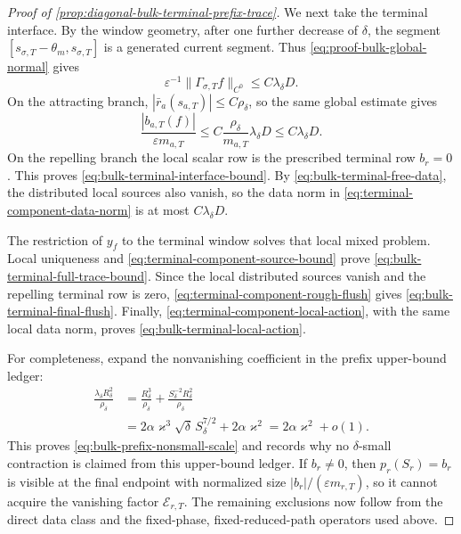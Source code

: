 \begin{proof}[Proof of
\cref{prop:diagonal-bulk-terminal-prefix-trace}]
We next take the terminal interface.  By the window geometry, after one
further decrease of \(\delta\), the segment
\([s_{\sigma,T}-\theta_m,s_{\sigma,T}]\) is a generated current segment.
Thus \cref{eq:proof-bulk-global-normal} gives
\begin{equation}
 \varepsilon^{-1}\|\Gamma_{\sigma,T}f\|_{C^0}
 \le C\lambda_\delta D.                         \label{eq:proof-bulk-interface-history}
\end{equation}
On the attracting branch,
\(|\bar r_a(s_{a,T})|\le C\rho_\delta\), so the same global estimate gives
\begin{equation}
 \frac{|b_{a,T}(f)|}{\varepsilon m_{a,T}}
 \le C\frac{\rho_\delta}{m_{a,T}}
          \lambda_\delta D
 \le C\lambda_\delta D.                        \label{eq:proof-bulk-attracting-interface-row}
\end{equation}
On the repelling branch the local scalar row is the prescribed terminal
row \(b_r=0\).  This proves
\cref{eq:bulk-terminal-interface-bound}.  By
\cref{eq:bulk-terminal-free-data}, the distributed local sources also
vanish, so the data norm in
\cref{eq:terminal-component-data-norm} is at most
\(C\lambda_\delta D\).

The restriction of \(y_f\) to the terminal window solves that local mixed
problem.  Local uniqueness and
\cref{eq:terminal-component-source-bound} prove
\cref{eq:bulk-terminal-full-trace-bound}.  Since the local distributed
sources vanish and the repelling terminal row is zero,
\cref{eq:terminal-component-rough-flush} gives
\cref{eq:bulk-terminal-final-flush}.  Finally,
\cref{eq:terminal-component-local-action}, with the same local data norm,
proves \cref{eq:bulk-terminal-local-action}.

For completeness, expand the nonvanishing coefficient in the prefix
upper-bound ledger:
\begin{align*}
 \frac{\lambda_\delta R_\delta^2}{\rho_\delta}
 &=\frac{R_\delta^3}{\rho_\delta}
   +\frac{S_\delta^{-2}R_\delta^2}{\rho_\delta}\\
 &=2\alpha\varkappa^3\sqrt\delta\,S_\delta^{7/2}
       +2\alpha\varkappa^2
 =2\alpha\varkappa^2+o(1).
\end{align*}
This proves \cref{eq:bulk-prefix-nonsmall-scale} and records why no
\(\delta\)-small contraction is claimed from this upper-bound ledger.
If \(b_r\ne0\),
then \(p_r(S_r)=b_r\) is visible at the final endpoint with normalized size
\(|b_r|/(\varepsilon m_{r,T})\), so it cannot acquire the vanishing factor
\(\mathcal E_{r,T}\).  The remaining exclusions now follow from the direct
data class and the fixed-phase, fixed-reduced-path operators used above.
\end{proof}

